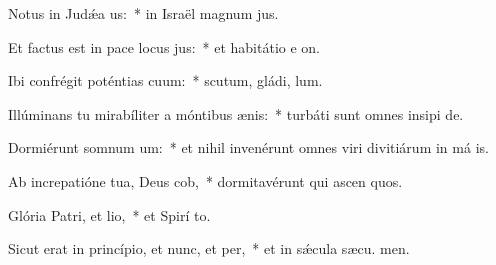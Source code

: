 \item Notus in Judǽa us:~* in Israël magnum  jus.
\item Et factus est in pace locus jus:~* et habitátio e  on.
\item Ibi confrégit poténtias cuum:~* scutum, gládi,  lum.
\item Illúminans tu mirabíliter a móntibus ænis:~* turbáti sunt omnes insipi de.
\item Dormiérunt somnum um:~* et nihil invenérunt omnes viri divitiárum in má is.
\item Ab increpatióne tua, Deus cob,~* dormitavérunt qui ascen quos.
\item Glória Patri, et lio,~* et Spirí to.
\item Sicut erat in princípio, et nunc, et per,~* et in sǽcula sæcu. men.
